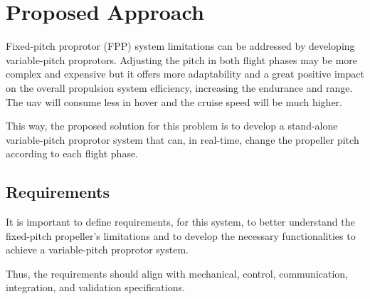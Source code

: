 \chapter{Proposed Approach}
\label{chap:Chapter3}

Fixed-pitch proprotor (FPP) system limitations can be addressed by developing variable-pitch proprotors.
Adjusting the pitch in both flight phases may be more complex and expensive but it offers more adaptability and a great positive impact on the overall propulsion system efficiency, increasing the endurance and range.
The \gls{uav} will consume less in hover and the cruise speed will be much higher.

This way, the proposed solution for this problem is to develop a stand-alone variable-pitch proprotor system that can, in real-time, change the propeller pitch according to each flight phase.


\section{Requirements}
It is important to define requirements, for this system, to better understand the fixed-pitch propeller's limitations and to develop the necessary functionalities to achieve a variable-pitch proprotor system.

Thus, the requirements should align with mechanical, control, communication, integration, and validation specifications.

